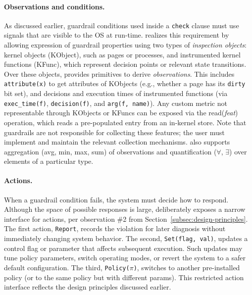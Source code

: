 \paragraph{Observations and conditions.}
As discussed earlier, guardrail conditions used inside a \texttt{check} clause must use signals that are visible to the OS at run-time. \lang realizes this requirement by allowing expression of guardrail properties using two types of {\em inspection objects}: kernel objects (\textsf{KObject}), such as pages or processes, and instrumented kernel functions (\textsf{KFunc}), which represent decision points or relevant state transitions.
Over these objects, \lang provides primitives to derive {\em observations}.
This includes {\tt attribute(x)} to get attributes of \textsf{KObject}s (e.g., whether a page has its {\tt dirty} bit set), %
and decisions and execution times of instrumented functions (via {\tt exec\_time(f)}, {\tt decision(f)}, and {\tt arg(f, name)}).
Any custom metric not representable through \textsf{KObject}s or \textsf{KFunc}s can be exposed via the {\sf read}(\textit{feat}) operation, which reads a pre-populated entry from an in-kernel store.
Note that guardrails are not responsible for collecting these features; the user must implement and maintain the relevant collection mechanisms.
\lang also supports aggregation ({\sf avg}, {\sf min}, {\sf max}, {\sf sum}) of observations and quantification ($\forall$, $\exists$) over elements of a particular type.

\paragraph{Actions.}
When a guardrail condition fails, the system must decide how to respond. Although the space of possible responses is large, \lang deliberately exposes a narrow interface for actions, per observation \#2 from Section~\ref{subsec:design-principles}. The first action, {\tt Report}, records the violation for later diagnosis without immediately changing system behavior. The second, {\tt Set(flag, val)}, updates a control flag or parameter that affects subsequent execution. Such updates may tune policy parameters, switch operating modes, or revert the system to a safer default configuration. The third, {\tt Policy(}$\pi${\tt )}, switches to another pre-installed policy (or to the same policy but with different params).
This restricted action interface reflects the design principles discussed earlier. 

